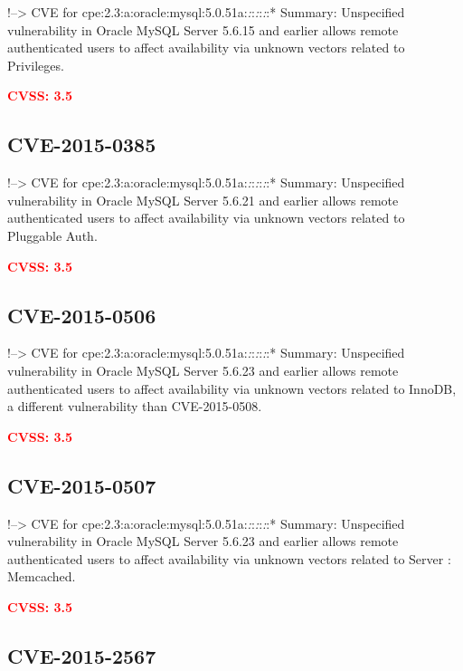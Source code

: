\documentclass[a4paper, 12pt]{article}
\begin{document}
!--\textgreater{} CVE for
cpe:2.3:a:oracle:mysql:5.0.51a:\emph{:}:\emph{:}:\emph{:}:* Summary:
Unspecified vulnerability in Oracle MySQL Server 5.6.15 and earlier
allows remote authenticated users to affect availability via unknown
vectors related to Privileges.

\textbf{\textcolor{red}{CVSS: 3.5}}

\hypertarget{cve-2015-0385}{%
\subsection{CVE-2015-0385}\label{cve-2015-0385}}

!--\textgreater{} CVE for
cpe:2.3:a:oracle:mysql:5.0.51a:\emph{:}:\emph{:}:\emph{:}:* Summary:
Unspecified vulnerability in Oracle MySQL Server 5.6.21 and earlier
allows remote authenticated users to affect availability via unknown
vectors related to Pluggable Auth.

\textbf{\textcolor{red}{CVSS: 3.5}}

\hypertarget{cve-2015-0506}{%
\subsection{CVE-2015-0506}\label{cve-2015-0506}}

!--\textgreater{} CVE for
cpe:2.3:a:oracle:mysql:5.0.51a:\emph{:}:\emph{:}:\emph{:}:* Summary:
Unspecified vulnerability in Oracle MySQL Server 5.6.23 and earlier
allows remote authenticated users to affect availability via unknown
vectors related to InnoDB, a different vulnerability than CVE-2015-0508.

\textbf{\textcolor{red}{CVSS: 3.5}}

\hypertarget{cve-2015-0507}{%
\subsection{CVE-2015-0507}\label{cve-2015-0507}}

!--\textgreater{} CVE for
cpe:2.3:a:oracle:mysql:5.0.51a:\emph{:}:\emph{:}:\emph{:}:* Summary:
Unspecified vulnerability in Oracle MySQL Server 5.6.23 and earlier
allows remote authenticated users to affect availability via unknown
vectors related to Server : Memcached.

\textbf{\textcolor{red}{CVSS: 3.5}}

\hypertarget{cve-2015-2567}{%
\subsection{CVE-2015-2567}\label{cve-2015-2567}}
\end{document}
